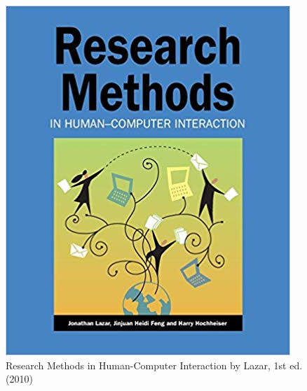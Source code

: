 \documentclass{beamer}
\begin{document}
\begin{frame}
\begin{columns}[t]
		\begin{figure}
			\includegraphics[width=1\linewidth]{lazar}
			\caption{Research Methods in Human-Computer Interaction by Lazar, 1st ed. (2010)}
		\end{figure}
		

\end{columns}
\end{frame}
\end{document}

